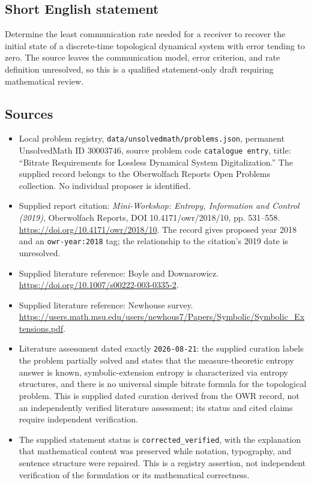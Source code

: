 \documentclass[11pt]{article}
\begin{document}
\subsection{Short English statement}
Determine the least communication rate needed for a receiver to recover the initial state of a discrete-time topological dynamical system with error tending to zero. The source leaves the communication model, error criterion, and rate definition unresolved, so this is a qualified statement-only draft requiring mathematical review.
\subsection{Sources}
\begin{itemize}
\item Local problem registry, \texttt{data/unsolvedmath/problems.json}, permanent UnsolvedMath ID \(30003746\), source problem code \texttt{catalogue entry}, title: ``Bitrate Requirements for Lossless Dynamical System Digitalization.'' The supplied record belongs to the Oberwolfach Reports Open Problems collection. No individual proposer is identified.
\item Supplied report citation: \emph{Mini-Workshop: Entropy, Information and Control (2019)}, Oberwolfach Reports, DOI 10.4171/owr/2018/10, pp. 531--558. \url{https://doi.org/10.4171/owr/2018/10}. The record gives proposed year 2018 and an \texttt{owr-year:2018} tag; the relationship to the citation's 2019 date is unresolved.
\item Supplied literature reference: Boyle and Downarowicz. \url{https://doi.org/10.1007/s00222-003-0335-2}.
\item Supplied literature reference: Newhouse survey. \url{https://users.math.msu.edu/users/newhous7/Papers/Symbolic/Symbolic_Extensions.pdf}.
\item Literature assessment dated exactly \texttt{2026-08-21}: the supplied curation labels the problem partially solved and states that the measure-theoretic entropy answer is known, symbolic-extension entropy is characterized via entropy structures, and there is no universal simple bitrate formula for the topological problem. This is supplied dated curation derived from the OWR record, not an independently verified literature assessment; its status and cited claims require independent verification.
\item The supplied statement status is \texttt{corrected\_verified}, with the explanation that mathematical content was preserved while notation, typography, and sentence structure were repaired. This is a registry assertion, not independent verification of the formulation or its mathematical correctness.
\end{itemize}
\end{document}
